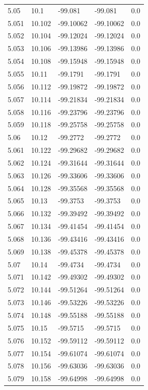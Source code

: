 \begin{tabular}{lllll}
5.05 & 10.1 & -99.081 & -99.081 & 0.0 \\
5.051 & 10.102 & -99.10062 & -99.10062 & 0.0 \\
5.052 & 10.104 & -99.12024 & -99.12024 & 0.0 \\
5.053 & 10.106 & -99.13986 & -99.13986 & 0.0 \\
5.054 & 10.108 & -99.15948 & -99.15948 & 0.0 \\
5.055 & 10.11 & -99.1791 & -99.1791 & 0.0 \\
5.056 & 10.112 & -99.19872 & -99.19872 & 0.0 \\
5.057 & 10.114 & -99.21834 & -99.21834 & 0.0 \\
5.058 & 10.116 & -99.23796 & -99.23796 & 0.0 \\
5.059 & 10.118 & -99.25758 & -99.25758 & 0.0 \\
5.06 & 10.12 & -99.2772 & -99.2772 & 0.0 \\
5.061 & 10.122 & -99.29682 & -99.29682 & 0.0 \\
5.062 & 10.124 & -99.31644 & -99.31644 & 0.0 \\
5.063 & 10.126 & -99.33606 & -99.33606 & 0.0 \\
5.064 & 10.128 & -99.35568 & -99.35568 & 0.0 \\
5.065 & 10.13 & -99.3753 & -99.3753 & 0.0 \\
5.066 & 10.132 & -99.39492 & -99.39492 & 0.0 \\
5.067 & 10.134 & -99.41454 & -99.41454 & 0.0 \\
5.068 & 10.136 & -99.43416 & -99.43416 & 0.0 \\
5.069 & 10.138 & -99.45378 & -99.45378 & 0.0 \\
5.07 & 10.14 & -99.4734 & -99.4734 & 0.0 \\
5.071 & 10.142 & -99.49302 & -99.49302 & 0.0 \\
5.072 & 10.144 & -99.51264 & -99.51264 & 0.0 \\
5.073 & 10.146 & -99.53226 & -99.53226 & 0.0 \\
5.074 & 10.148 & -99.55188 & -99.55188 & 0.0 \\
5.075 & 10.15 & -99.5715 & -99.5715 & 0.0 \\
5.076 & 10.152 & -99.59112 & -99.59112 & 0.0 \\
5.077 & 10.154 & -99.61074 & -99.61074 & 0.0 \\
5.078 & 10.156 & -99.63036 & -99.63036 & 0.0 \\
5.079 & 10.158 & -99.64998 & -99.64998 & 0.0 \\

\end{tabular}
